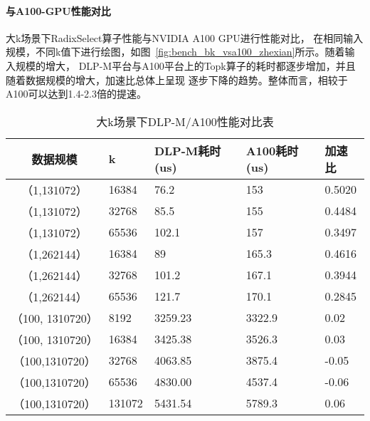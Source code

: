 \paragraph{与A100-GPU性能对比}
大k场景下RadixSelect算子性能与NVIDIA A100 GPU进行性能对比，
在相同输入规模，不同k值下进行绘图，如图~\ref{fig:bench_bk_vsa100_zhexian}所示。随着输入规模的增大，
DLP-M平台与A100平台上的Topk算子的耗时都逐步增加，并且随着数据规模的增大，加速比总体上呈现
逐步下降的趋势。整体而言，相较于A100可以达到1.4-2.3倍的提速。
\begin{table}
    \centering
    \caption{大k场景下DLP-M/A100性能对比表}
    \begin{tabular}{cllll}
    \toprule
    数据规模 & k &   DLP-M耗时(us) & A100耗时(us) & 加速比 \\
    \midrule

    （1,131072） & 16384    & 76.2 & 153 & 0.5020\\
    （1,131072） & 32768   & 85.5 & 155 & 0.4484\\
    （1,131072） & 65536   & 102.1 & 157 & 0.3497  \\
    
    （1,262144） & 16384   & 89 & 165.3 & 0.4616  \\
    （1,262144） & 32768   & 101.2 & 167.1 & 0.3944 \\
    （1,262144） & 65536   & 121.7 & 170.1 & 0.2845 \\
    
    （100, 1310720）& 8192 & 3259.23 & 3322.9 & 0.02\\
    （100, 1310720）& 16384 & 3425.38 & 3526.3 & 0.03\\
    
    （100,1310720）&32768    & 4063.85 & 3875.4 & -0.05  \\
    （100,1310720）&65536    & 4830.00 & 4537.4 & -0.06 \\
    （100,1310720）&131072   & 5431.54 & 5789.3 & 0.06 \\
  
    \bottomrule
    \end{tabular}
    \end{table}


    
